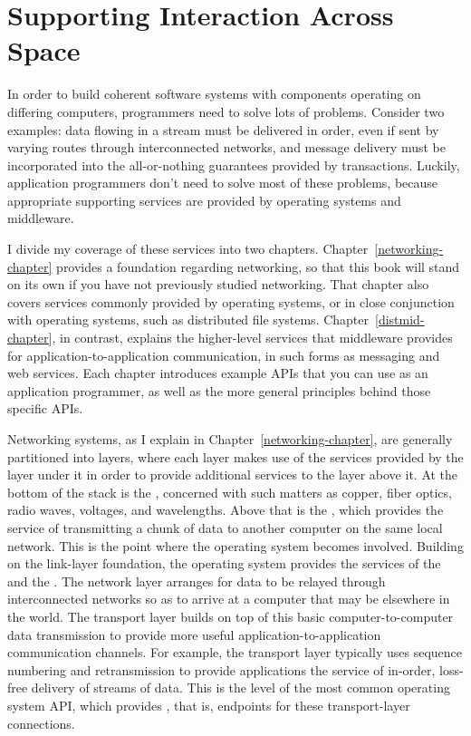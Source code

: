 \section{Supporting Interaction Across Space}\label{networking-section}

In order to build coherent software systems with components operating
on differing computers, programmers need to solve lots of problems.
Consider two examples: data flowing in a stream must be delivered in
order, even if sent by varying routes through interconnected networks,
and message delivery must be incorporated into the all-or-nothing
guarantees provided by transactions.  Luckily, application programmers
don't need to solve most of these problems, because appropriate
supporting services are provided by operating systems and middleware.

I divide my coverage of these services into two chapters.
Chapter~\ref{networking-chapter} provides a foundation regarding
networking, so that this book will stand on its own if you have not
previously studied networking.  That chapter also covers services
commonly provided by operating systems, or in close conjunction with
operating systems, such as distributed file systems.
Chapter~\ref{distmid-chapter}, in contrast, explains the higher-level
services that middleware provides for application-to-application
communication, in such forms as messaging and web services.  Each
chapter introduces example APIs that you can use as an application
programmer, as well as the more general principles behind those
specific APIs.

Networking systems, as I explain in Chapter~\ref{networking-chapter},
are generally partitioned into layers, where each layer makes use of
the services provided by the layer under it in order to provide
additional services to the layer above it.  At the bottom of the stack
is the , concerned with such matters as copper,
fiber optics, radio waves, voltages, and wavelengths.  Above that is
the , which provides the service of transmitting a
chunk of data to another computer on the same local network.  This is
the point where the operating system becomes involved.  Building on
the link-layer foundation, the operating system provides the services
of the  and the .  The network
layer arranges for data to be relayed through interconnected networks
so as to arrive at a computer that may be elsewhere in the world.  The
transport layer builds on top of this basic computer-to-computer data
transmission to provide more useful application-to-application
communication channels.  For example, the transport layer typically
uses sequence numbering and retransmission to provide applications the
service of in-order, loss-free delivery of streams of data.  This is
the level of the most common operating system API, which provides
, that is, endpoints for these transport-layer
connections.

